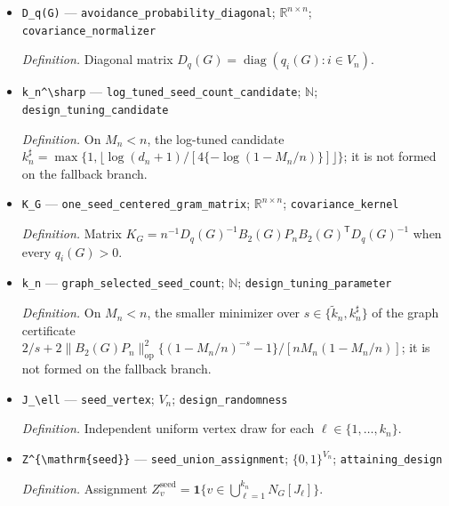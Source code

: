 \documentclass{article}
\begin{document}
\begin{itemize}
  \item \texttt{D\_\allowbreak{}q(G)} --- \texttt{avoidance\_\allowbreak{}probability\_\allowbreak{}diagonal}; \(\mathbb R^{n\times n}\); \texttt{covariance\_\allowbreak{}normalizer}
  \par\smallskip\noindent\emph{Definition.} Diagonal matrix \(D_q(G)=\operatorname{diag}(q_i(G):i\in V_n)\).
  \item \texttt{k\_\allowbreak{}n\textasciicircum{}\textbackslash{}\allowbreak{}sharp} --- \texttt{log\_\allowbreak{}tuned\_\allowbreak{}seed\_\allowbreak{}count\_\allowbreak{}candidate}; \(\mathbb N\); \texttt{design\_\allowbreak{}tuning\_\allowbreak{}candidate}
  \par\smallskip\noindent\emph{Definition.} On \(M_n<n\), the log-tuned candidate \(k_n^\sharp=\max\{1,\lfloor\log(d_n+1)/[4\{-\log(1-M_n/n)\}]\rfloor\}\); it is not formed on the fallback branch.
  \item \texttt{K\_\allowbreak{}G} --- \texttt{one\_\allowbreak{}seed\_\allowbreak{}centered\_\allowbreak{}gram\_\allowbreak{}matrix}; \(\mathbb R^{n\times n}\); \texttt{covariance\_\allowbreak{}kernel}
  \par\smallskip\noindent\emph{Definition.} Matrix \(K_G=n^{-1}D_q(G)^{-1}B_2(G)P_nB_2(G)^{\mathsf T}D_q(G)^{-1}\) when every \(q_i(G)>0\).
  \item \texttt{k\_\allowbreak{}n} --- \texttt{graph\_\allowbreak{}selected\_\allowbreak{}seed\_\allowbreak{}count}; \(\mathbb N\); \texttt{design\_\allowbreak{}tuning\_\allowbreak{}parameter}
  \par\smallskip\noindent\emph{Definition.} On \(M_n<n\), the smaller minimizer over \(s\in\{\widetilde k_n,k_n^\sharp\}\) of the graph certificate \(2/s+2\|B_2(G)P_n\|_{\mathrm{op}}^2\{(1-M_n/n)^{-s}-1\}/[nM_n(1-M_n/n)]\); it is not formed on the fallback branch.
  \item \texttt{J\_\allowbreak{}\textbackslash{}\allowbreak{}ell} --- \texttt{seed\_\allowbreak{}vertex}; \(V_n\); \texttt{design\_\allowbreak{}randomness}
  \par\smallskip\noindent\emph{Definition.} Independent uniform vertex draw for each \(\ell\in\{1,\ldots,k_n\}\).
  \item \texttt{Z\textasciicircum{}\{\textbackslash{}\allowbreak{}mathrm\{seed\}\allowbreak{}\}\allowbreak{}} --- \texttt{seed\_\allowbreak{}union\_\allowbreak{}assignment}; \(\{0,1\}^{V_n}\); \texttt{attaining\_\allowbreak{}design}
  \par\smallskip\noindent\emph{Definition.} Assignment \(Z^{\mathrm{seed}}_v=\mathbf 1\{v\in\bigcup_{\ell=1}^{k_n}N_G[J_\ell]\}\).

\end{itemize}
\end{document}
